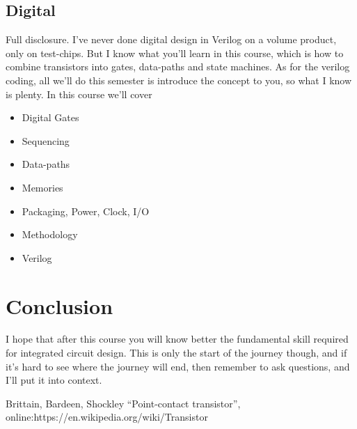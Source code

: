 \documentclass[technote,10pt,a4paper]{IEEEtran}
\begin{document}
\subsection{Digital}
Full disclosure. I've never done digital design in Verilog on a volume product, only on
test-chips. But I know what you'll learn  in this course, which is how
to combine transistors into gates, data-paths and state machines. As for the verilog coding, all we'll do
this semester is introduce the concept to you, so what I know is plenty.
In this course we'll cover
\begin{itemize}
  \item Digital Gates
  \item Sequencing
  \item Data-paths
  \item Memories
  \item Packaging, Power, Clock, I/O
  \item Methodology
  \item Verilog
\end{itemize}

\section{Conclusion}
I hope that after this course you will know better the fundamental skill
required for integrated circuit design. This is only the start of the journey
though, and if it's hard to see where the journey will end, then remember to ask
questions, and I'll put it into context.

\begin{thebibliography}{1}
  \providecommand{\url}[1]{#1}

  Brittain, Bardeen, Shockley ``Point-contact transistor'', online:\url{https://en.wikipedia.org/wiki/Transistor}




\end{thebibliography}
\end{document}

